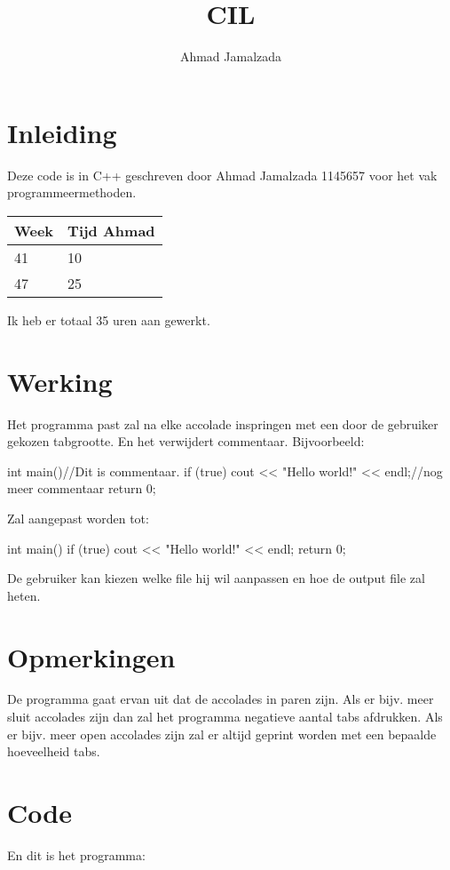 \documentclass{article}
\date{\displaydate{date}}
\title{CIL}
\author{Ahmad Jamalzada}
\begin{document}

\maketitle

\section{Inleiding}
Deze code is in C++ geschreven door Ahmad Jamalzada 1145657 voor het vak programmeermethoden.

\begin{center}
\begin{tabular}{l|l}
\hline
Week & Tijd Ahmad\\
\hline
41 & 10\\
47 & 25
\end{tabular}
\end{center}
Ik heb er totaal 35 uren aan gewerkt.

\section{Werking}
Het programma past zal na elke accolade inspringen met een door de gebruiker gekozen tabgrootte. En het verwijdert commentaar. Bijvoorbeeld:

\begin{verbatim*}
int main(){//Dit is commentaar.
if (true){
cout << "Hello world!" << endl;//nog meer commentaar
return 0;
}
}
\end{verbatim*}
Zal aangepast worden tot:

\begin{verbatim*}
int main(){
    if (true){
        cout << "Hello world!" << endl;
    }
    return 0;
}
\end{verbatim*}
De gebruiker kan kiezen welke file hij wil aanpassen en hoe de output file zal heten.

\section{Opmerkingen}
De programma gaat ervan uit dat de accolades in paren zijn.
Als er bijv. meer sluit accolades zijn dan zal het programma negatieve aantal tabs afdrukken. Als er bijv. meer open accolades zijn zal er altijd geprint worden met een bepaalde hoeveelheid tabs.
\bigskip

\section{Code}
En dit is het programma:


\end{document}

